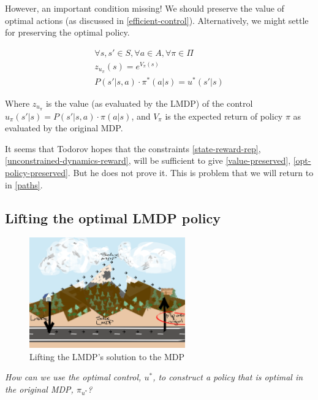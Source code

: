 However, an important condition missing!
We should preserve the value of optimal actions (as discussed in \ref{efficient-control}).
Alternatively, we might settle for preserving the optimal policy.

\begin{align*}
\forall s, s' \in S, \forall a \in A, \forall \pi \in \Pi \\
z_{u_{\pi}}(s) = e^{V_{\pi}(s)} \label{value-preserved}\tag{value} \\
P(s'|s, a) \cdot \pi^{* }(a|s) = u^{* }(s'|s) \label{opt-policy-preserved}\tag{optimal policy}
\end{align*}

Where $z_{u_{\pi}}$ is the value (as evaluated by the LMDP) of the control $u_{\pi}(s'|s) = P(s'|s, a) \cdot \pi(a|s)$, and $V_{\pi}$ is the expected return of policy $\pi$ as evaluated by the original MDP.

It seems that Todorov hopes that the constraints \ref{state-reward-rep}, \ref{unconstrained-dynamics-reward},
will be sufficient to give \ref{value-preserved}, \ref{opt-policy-preserved}. But he does not prove it.
This is problem that we will return to in \ref{paths}.

\subsection{Lifting the optimal LMDP policy}\label{lift-mdp}

\begin{figure}[h!]
\centering
\includegraphics[width=0.6\textwidth,height=0.3\textheight]{../../pictures/drawings/abstract-representations-project.png}
\caption{Lifting the LMDP's solution to the MDP}
\end{figure}

\begin{displayquote}
\textsl{How can we use the optimal control, $u^{* }$, to construct a policy that is optimal in the original MDP, $\pi_{u^* }$?}
\end{displayquote}

